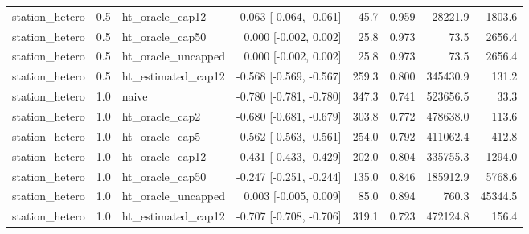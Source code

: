 \begin{tabular}{lllrrrrr}
station\_hetero & 0.5 & ht\_oracle\_cap12 & -0.063 [-0.064, -0.061] & 45.7 & 0.959 & 28221.9 & 1803.6 \\
station\_hetero & 0.5 & ht\_oracle\_cap50 & 0.000 [-0.002, 0.002] & 25.8 & 0.973 & 73.5 & 2656.4 \\
station\_hetero & 0.5 & ht\_oracle\_uncapped & 0.000 [-0.002, 0.002] & 25.8 & 0.973 & 73.5 & 2656.4 \\
station\_hetero & 0.5 & ht\_estimated\_cap12 & -0.568 [-0.569, -0.567] & 259.3 & 0.800 & 345430.9 & 131.2 \\
station\_hetero & 1.0 & naive & -0.780 [-0.781, -0.780] & 347.3 & 0.741 & 523656.5 & 33.3 \\
station\_hetero & 1.0 & ht\_oracle\_cap2 & -0.680 [-0.681, -0.679] & 303.8 & 0.772 & 478638.0 & 113.6 \\
station\_hetero & 1.0 & ht\_oracle\_cap5 & -0.562 [-0.563, -0.561] & 254.0 & 0.792 & 411062.4 & 412.8 \\
station\_hetero & 1.0 & ht\_oracle\_cap12 & -0.431 [-0.433, -0.429] & 202.0 & 0.804 & 335755.3 & 1294.0 \\
station\_hetero & 1.0 & ht\_oracle\_cap50 & -0.247 [-0.251, -0.244] & 135.0 & 0.846 & 185912.9 & 5768.6 \\
station\_hetero & 1.0 & ht\_oracle\_uncapped & 0.003 [-0.005, 0.009] & 85.0 & 0.894 & 760.3 & 45344.5 \\
station\_hetero & 1.0 & ht\_estimated\_cap12 & -0.707 [-0.708, -0.706] & 319.1 & 0.723 & 472124.8 & 156.4 \\
\bottomrule
\end{tabular}
